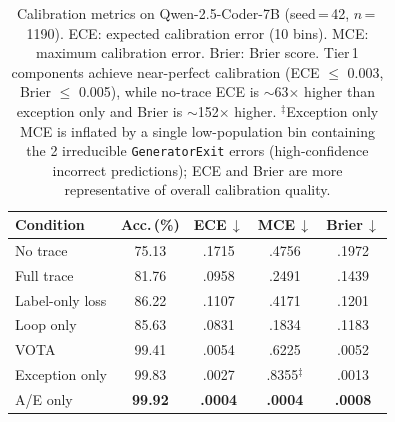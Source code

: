\begin{table}[t]
\centering
\small
\begin{tabular}{@{}lcccc@{}}
\toprule
\textbf{Condition} & \textbf{Acc.\,(\%)} & \textbf{ECE\,$\downarrow$} & \textbf{MCE\,$\downarrow$} & \textbf{Brier\,$\downarrow$} \\
\midrule
No trace            & 75.13 & .1715 & .4756 & .1972 \\
Full trace          & 81.76 & .0958 & .2491 & .1439 \\
Label-only loss     & 86.22 & .1107 & .4171 & .1201 \\
Loop only           & 85.63 & .0831 & .1834 & .1183 \\
\midrule
VOTA                & 99.41 & .0054 & .6225 & .0052 \\
Exception only      & 99.83 & .0027 & .8355$^\ddagger$ & .0013 \\
A/E only            & \textbf{99.92} & \textbf{.0004} & \textbf{.0004} & \textbf{.0008} \\
\bottomrule
\end{tabular}
\caption{
Calibration metrics on Qwen-2.5-Coder-7B (seed\,=\,42, $n$\,=\,1190).
ECE: expected calibration error (10 bins).
MCE: maximum calibration error.
Brier: Brier score.
Tier\,1 components achieve near-perfect calibration
(ECE $\leq$ 0.003, Brier $\leq$ 0.005),
while no-trace ECE is ${\sim}$63$\times$ higher than exception only
and Brier is ${\sim}$152$\times$ higher.
$^\ddagger$Exception only MCE is inflated by a single low-population bin
containing the 2 irreducible \texttt{GeneratorExit} errors
(high-confidence incorrect predictions); ECE and Brier
are more representative of overall calibration quality.
}
\label{tab:calibration}
\end{table}
